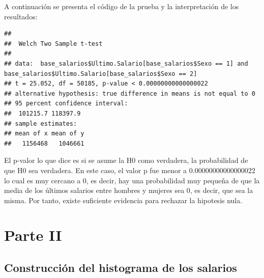 \documentclass[
]{article}
\newenvironment{Shaded}{\begin{snugshade}}{\end{snugshade}}
\newcommand{\AttributeTok}[1]{\textcolor[rgb]{0.13,0.29,0.53}{#1}}
\newcommand{\ConstantTok}[1]{\textcolor[rgb]{0.56,0.35,0.01}{#1}}
\newcommand{\DecValTok}[1]{\textcolor[rgb]{0.00,0.00,0.81}{#1}}
\newcommand{\FloatTok}[1]{\textcolor[rgb]{0.00,0.00,0.81}{#1}}
\newcommand{\FunctionTok}[1]{\textcolor[rgb]{0.13,0.29,0.53}{\textbf{#1}}}
\newcommand{\NormalTok}[1]{#1}
\newcommand{\SpecialCharTok}[1]{\textcolor[rgb]{0.81,0.36,0.00}{\textbf{#1}}}
\newcommand{\StringTok}[1]{\textcolor[rgb]{0.31,0.60,0.02}{#1}}
\begin{document}
A continuación se presenta el código de la prueba y la interpretación de
los resultados:

\begin{Shaded}
\end{Shaded}

\begin{verbatim}
## 
##  Welch Two Sample t-test
## 
## data:  base_salarios$Ultimo.Salario[base_salarios$Sexo == 1] and base_salarios$Ultimo.Salario[base_salarios$Sexo == 2]
## t = 25.052, df = 50185, p-value < 0.00000000000000022
## alternative hypothesis: true difference in means is not equal to 0
## 95 percent confidence interval:
##  101215.7 118397.9
## sample estimates:
## mean of x mean of y 
##   1156468   1046661
\end{verbatim}

El p-valor lo que dice es si se asume la H0 como verdadera, la
probabilidad de que H0 sea verdadera. En este caso, el valor p fue menor
a \(0.00000000000000022\) lo cual es muy cercano a 0, es decir, hay una
probabilidad muy pequeña de que la media de los últimos salarios entre
hombres y mujeres sea 0, es decir, que sea la misma. Por tanto, existe
suficiente evidencia para rechazar la hipotesis nula.

\newpage

\hypertarget{parte-ii}{%
\section{Parte II}\label{parte-ii}}

\hypertarget{construcciuxf3n-del-histograma-de-los-salarios}{%
\subsection{Construcción del histograma de los
salarios}\label{construcciuxf3n-del-histograma-de-los-salarios}}
\end{document}

